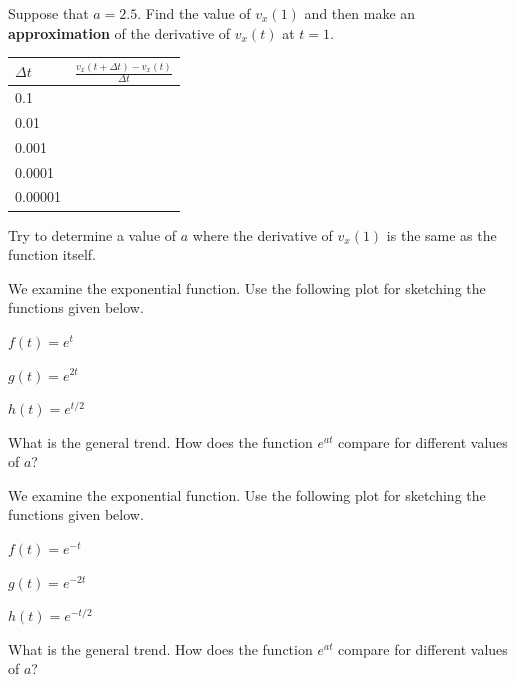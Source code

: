 \begin{problem}
\begin{subproblem}
    \vfill

    \clearpage

  \item Suppose that $a=2.5$. Find the value of $v_x(1)$ and then make
    an \textbf{approximation} of the derivative of $v_x(t)$ at $t=1$.

    \begin{tabular}{l|l}
      $\Delta t$ & $\frac{v_x(t+\Delta t) - v_x(t)}{\Delta t}$ \\ \hline
      0.1 & \\      [10pt]
      0.01 & \\     [10pt]
      0.001 & \\    [10pt]
      0.0001 & \\   [10pt]
      0.00001 & \\
    \end{tabular}

    \vfill

    \item Try to determine a value of $a$ where the derivative of
      $v_x(1)$ is the same as the function itself.
      \vfill

  \end{subproblem}

  \clearpage

\item We examine the exponential function. Use the following plot for
  sketching the functions given below.

  \scalebox{0.75}{}

  \begin{subproblem}
  \item $f(t) = e^t$
  \item $g(t) = e^{2t}$
  \item $h(t) = e^{t/2}$
  \item What is the general trend. How does the function $e^{at}$
    compare for different values of $a$?
  \end{subproblem}

  \clearpage

\item We examine the exponential function. Use the following plot for
  sketching the functions given below.

  \scalebox{0.75}{}

  \begin{subproblem}
  \item $f(t) = e^{-t}$
  \item $g(t) = e^{-2t}$
  \item $h(t) = e^{-t/2}$
  \item What is the general trend. How does the function $e^{at}$
    compare for different values of $a$?
  \end{subproblem}



\end{problem}

